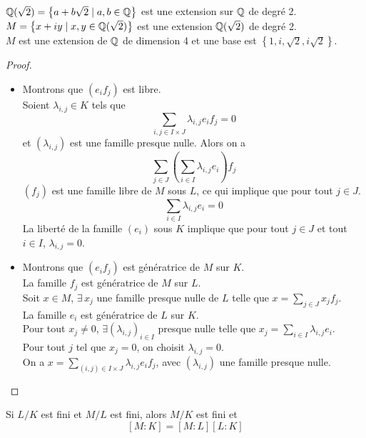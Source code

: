 \begin{example}
	$\mathbb{Q}(\sqrt{2}) = \left\{ a + b\sqrt{2} \mid a,b \in \mathbb{Q} \right\}$ est une extension sur $\mathbb{Q}$ de degré 2.\\
	$M = \left\{ x + iy \mid x,y \in \mathbb{Q}(\sqrt{2}) \right\}$ est une extension $\mathbb{Q}(\sqrt{2})$ de degré 2.\\
	$M$ est une extension de $\mathbb{Q}$ de dimension 4 et une base est $\left\{ 1, i , \sqrt{2}, i\sqrt{2}\right\}$.
\end{example}


\begin{proof}
	\begin{itemize}
		\item Montrons que $(e_if_j)$ est libre. \\
		      Soient $\lambda_{i,j} \in K$ tels que
		      $$ \sum\limits_{i,j \in I \times J} \lambda_{i,j} e_i f_j = 0$$
		      et $(\lambda_{i,j})$ est une famille presque nulle. Alors  on a
		      $$ \sum\limits_{j \in J} \left( \sum\limits_{i \in I} \lambda_{i,j} e_i \right) f_j $$
		      $(f_j)$ est une famille libre de $M$ sous $L$, ce qui implique que pour tout $j \in J$.
		      $$ \sum\limits_{i\in I } \lambda_{i,j} e_i = 0$$
		      La liberté de la famille $(e_i)$ sous $K$ implique que pour tout $j \in J$ et tout $i \in I$, $\lambda_{i,j} = 0$.
		\item Montrons que $(e_if_j)$  est génératrice de $M$ sur $K$.\\
		      La famille $f_j$ est génératrice de $M$ sur $L$.\\
		      Soit $x \in M$, $\exists \, x_j$ une famille presque nulle de $L$ telle que $x = \sum\limits_{j\in J} x_j f_j$.\\
		      La famille $e_i$ est génératrice de $L$ sur $K$.\\
		      Pour tout $x_j \neq 0 $, $\exists (\lambda_{i,j})_{i \in I}$ presque nulle telle que $x_j = \sum\limits_{i \in I} \lambda_{i,j}e_i$.\\
		      Pour tout $j$ tel que $x_j = 0$, on choisit $\lambda_{i,j} = 0$. \\
		      On a $x = \sum\limits_{(i,j)\in I\times J} \lambda_{i,j} e_i f_j$, avec $(\lambda_{i,j})$ une famille presque nulle.
	\end{itemize}
\end{proof}


\begin{coro}[important]
	Si $L / K$ est fini et $M/L$ est fini, alors $M/K$ est fini et
	$$ [M:K] = [M:L] [L:K] $$
\end{coro}


